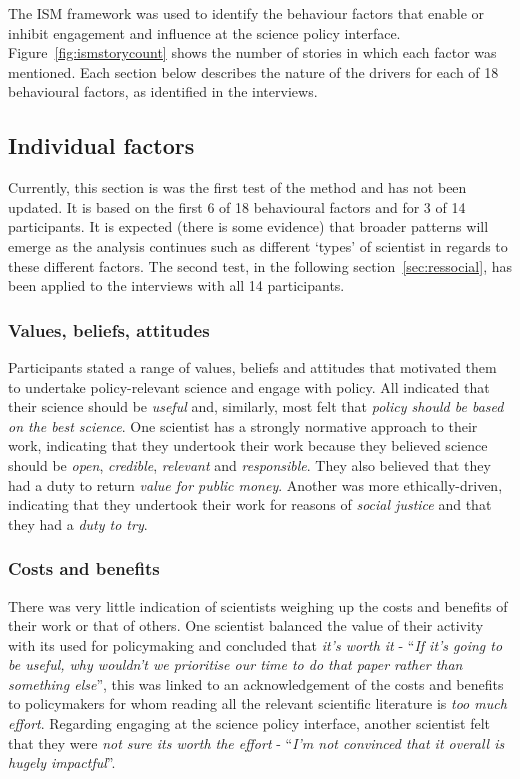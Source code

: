 The ISM framework was used to identify the behaviour factors that enable or inhibit engagement and influence at the science policy interface. Figure~\ref{fig:ismstorycount} shows the number of stories in which each factor was mentioned. Each section below describes the nature of the drivers for each of 18 behavioural factors, as identified in the interviews.


\subsection{Individual factors}\label{sec:resindividual}

Currently, this section is was the first test of the method and has not been updated. It is based on the first 6 of 18 behavioural factors and for 3 of 14 participants. It is expected (there is some evidence) that broader patterns will emerge as the analysis continues such as different `types' of scientist in regards to these different factors. The second test, in the following section~\ref{sec:ressocial}, has been applied to the interviews with all 14 participants.

\subsubsection{Values, beliefs, attitudes}\label{sec:resismvalues}
Participants stated a range of values, beliefs and attitudes that motivated them to undertake policy-relevant science and engage with policy. All indicated that their science should be \emph{useful} and, similarly, most felt that \emph{policy should be based on the best science}. One scientist has a strongly normative approach to their work, indicating that they undertook their work because they believed science should be \emph{open}, \emph{credible}, \emph{relevant} and \emph{responsible}. They also believed that they had a duty to return \emph{value for public money}. Another was more ethically-driven, indicating that they undertook their work for reasons of \emph{social justice} and that they had a \emph{duty to try}.  

\subsubsection{Costs and benefits}\label{sec:resismcab}
There was very little indication of scientists weighing up the costs and benefits of their work or that of others. One scientist balanced the value of their activity with its used for policymaking and concluded that \emph{it's worth it} - ``\emph{If it's going to be useful, why wouldn't we prioritise our time to do that paper rather than something else}'', this was linked to an acknowledgement of the costs and benefits to policymakers for whom reading all the relevant scientific literature is \emph{too much effort}. Regarding engaging at the science policy interface, another scientist felt that they were \emph{not sure its worth the effort} - ``\emph{I'm not convinced that it overall is hugely impactful}''.

